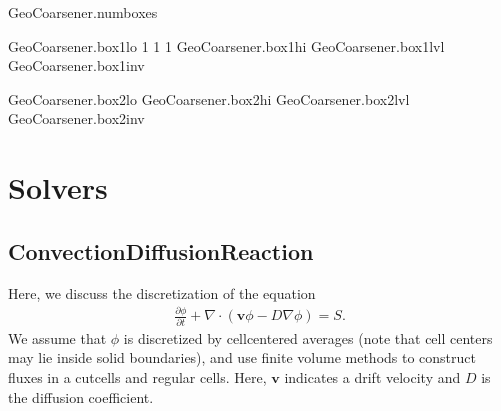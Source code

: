 \documentclass[letterpaper,10pt,english]{sphinxmanual}
\begin{document}
\begin{sphinxVerbatim}[commandchars=\\\{\},formatcom=\scriptsize]
GeoCoarsener.num\PYGZus{}boxes                

GeoCoarsener.box1\PYGZus{}lo      \PYGZhy{}1 \PYGZhy{}1 \PYGZhy{}1     
GeoCoarsener.box1\PYGZus{}hi                
GeoCoarsener.box1\PYGZus{}lvl                 
GeoCoarsener.box1\PYGZus{}inv             

GeoCoarsener.box2\PYGZus{}lo                
GeoCoarsener.box2\PYGZus{}hi                
GeoCoarsener.box2\PYGZus{}lvl                 
GeoCoarsener.box2\PYGZus{}inv             
\end{sphinxVerbatim}


\chapter{Solvers}
\label{\detokenize{index:solvers}}

\section{Convection\sphinxhyphen{}Diffusion\sphinxhyphen{}Reaction}
\label{\detokenize{Solvers/CDR:convection-diffusion-reaction}}\label{\detokenize{Solvers/CDR:chap-cdr}}\label{\detokenize{Solvers/CDR::doc}}
Here, we discuss the discretization of the equation
\begin{equation*}
\begin{split}\frac{\partial \phi}{\partial t} + \nabla\cdot\left(\mathbf{v} \phi - D\nabla \phi\right) = S.\end{split}
\end{equation*}
We assume that \(\phi\) is discretized by cell\sphinxhyphen{}centered averages (note that cell centers may lie inside solid boundaries), and use finite volume methods to construct fluxes in a cut\sphinxhyphen{}cells and regular cells.
Here, \(\mathbf{v}\) indicates a drift velocity and \(D\) is the diffusion coefficient.
\end{document}
